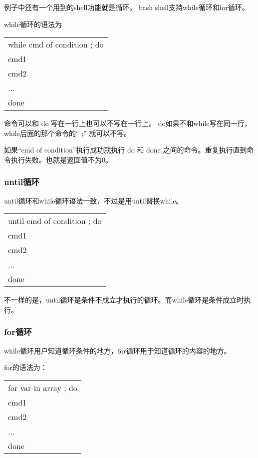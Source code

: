 \documentclass[amstex,twoside]{ctexbook}
\newenvironment{code}{\small\tt\begin{longtable}{p{0.8\textwidth}}}{\end{longtable}}
\begin{document}
例子中还有一个用到的shell功能就是循环。 bash shell支持while循环和for循环。

while循环的语法为 
\begin{code}

while cmd of condition ; do \\
	cmd1\\
	cmd2\\
	...\\
done\\

\end{code}

命令可以和 do 写在一行上也可以不写在一行上。
do如果不和while写在同一行，while后面的那个命令的“ ;” 就可以不写。

如果“cmd of condition”执行成功就执行 do 和 done 之间的命令。重复执行直到命令执行失败。也就是返回值不为0。


\subsubsection{until循环}

until循环和while循环语法一致，不过是用until替换while。


\begin{code}

until cmd of condition ; do \\
	cmd1\\
	cmd2\\
	...\\
done\\

\end{code}

不一样的是，until循环是条件不成立才执行的循环。而while循环是条件成立时执行。


\subsubsection{for循环}

while循环用户知道循环条件的地方，for循环用于知道循环的内容的地方。

for的语法为：

\begin{code}

for var in array ; do \\
cmd1 \\
cmd2 \\
... \\
done 

\end{code}
\end{document}
